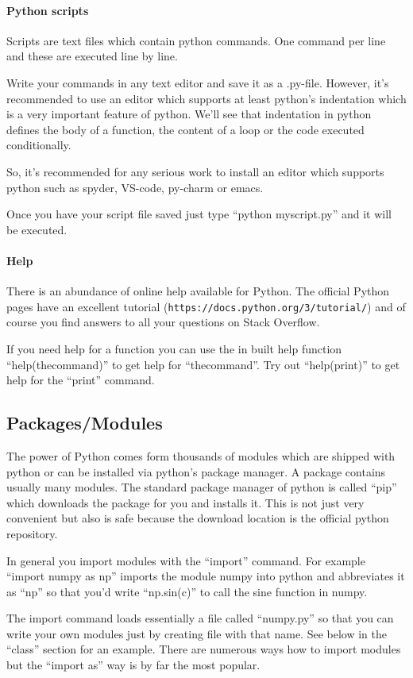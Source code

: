 \documentclass[12pt,a4paper]{article}
\begin{document}
\paragraph{Python scripts}
Scripts are text files which contain python commands. One command
per line and these are executed line by line.

Write your commands in any text editor and save it as a
.py-file. However, it's recommended to use an editor which supports at
least python's indentation which is a very important feature of python.
We'll see that indentation in python
defines the body of a function, the content of a loop or the code
executed conditionally.

So, it's recommended for any serious
work to install an editor which supports python such as spyder, VS-code, py-charm
or emacs.

Once you have your script file saved just type ``python myscript.py''
and it will be executed.

\paragraph{Help}
There is an abundance of online help available for Python. The
official Python pages have an excellent tutorial
(\texttt{https://docs.python.org/3/tutorial/}) and of course you find
answers to all your questions on Stack Overflow.

If you need help for a function you can use the in built help function
``help(thecommand)'' to get help for ``thecommand''. Try out ``help(print)''
to get help for the ``print'' command.

\subsection{Packages/Modules}
The power of Python comes form thousands of modules which are shipped
with python or can be installed via python's package
manager. A package contains usually many modules.
The standard package manager of python is called ``pip''
which downloads the package for you and installs it. This is not just
very convenient but also is safe because the download location is the
official python repository.

In general you import modules with the ``import'' command. For example
``import numpy as np'' imports the module numpy into python and
abbreviates it as ``np'' so that you'd write ``np.sin(c)'' to call the
sine function in numpy.

The import command loads essentially a file
called ``numpy.py'' so that you can write your own modules just by
creating file with that name. See below in the ``class'' section for
an example. There are numerous ways how to import modules but the
``import as'' way is by far the most popular.
\end{document}
